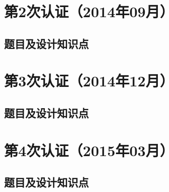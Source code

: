 \documentclass[cn,10pt,math=newtx,citestyle=gb7714-2015,bibstyle=gb7714-2015]{elegantbook}
\begin{document}










\chapter{第2次认证（2014年09月）}

\section{题目及设计知识点}









 

\chapter{第3次认证（2014年12月）}

\section{题目及设计知识点}











\chapter{第4次认证（2015年03月）}

\section{题目及设计知识点}




\end{document}

